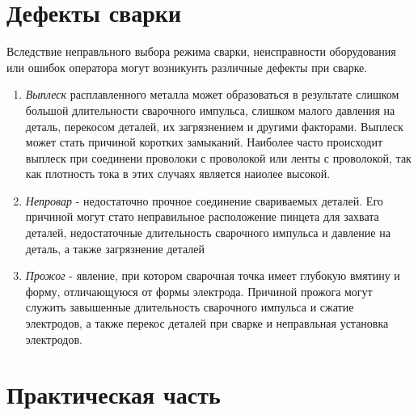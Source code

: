 \documentclass[12pt]{article}
\begin{document}
\section{Дефекты сварки}
Вследствие неправльного выбора режима сварки, неисправности оборудования или ошибок оператора могут возникунть различные дефекты при сварке.
\begin{enumerate}
    \item {\it Выплеск} расплавленного металла может образоваться в результате слишком большой длительности сварочного импульса, слишком малого давления на деталь, перекосом деталей, их загрязнением и другими факторами. Выплеск может стать причиной коротких замыканий. Наиболее часто происходит выплеск при соединени проволоки с проволокой или ленты с проволокой, так как плотность тока в этих случаях является наиолее высокой.
    \item {\it Непровар} - недостаточно прочное соединение свариваемых деталей. Его причиной могут стато неправильное расположение пинцета для захвата деталей, недостаточные длительность сварочного импульса и давление на деталь, а также загрязнение деталей
    \item {\it Прожог} - явление, при котором сварочная точка имеет глубокую вмятину  и форму, отличающуюся от формы электрода. Причиной прожога могут служить завышенные длительность сварочного импульса и сжатие электродов, а также перекос деталей при сварке и неправльная установка электродов.
\end{enumerate}

\newpage

\section{Практическая часть}
\end{document}
